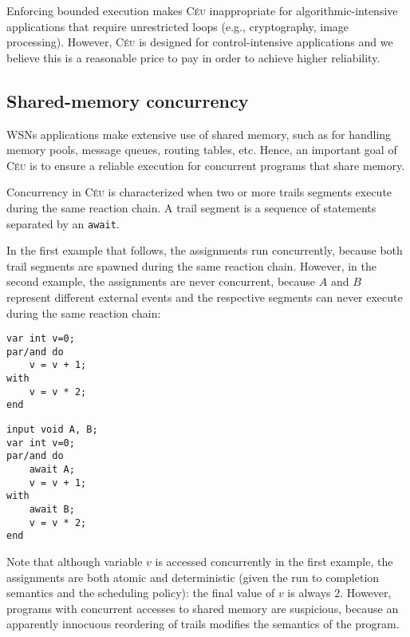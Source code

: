 \documentclass[10pt]{sensys-proc}
\newcommand{\CEU}{\textsc{C\'{e}u}\xspace}
\newcommand{\code}[1] {{\small{\texttt{#1}}}}
\begin{document}
Enforcing bounded execution makes \CEU inappropriate for algorithmic-intensive 
applications that require unrestricted loops (e.g., cryptography, image 
processing).
However, \CEU is designed for control-intensive applications and we believe 
this is a reasonable price to pay in order to achieve higher reliability.


\subsection{Shared-memory concurrency}
\label{sec.ceu.shared}

WSNs applications make extensive use of shared memory, such as for handling 
memory pools, message queues, routing tables, etc.
Hence, an important goal of \CEU is to ensure a reliable execution for 
concurrent programs that share memory.

Concurrency in \CEU is characterized when two or more trails segments execute 
during the same reaction chain.
A trail segment is a sequence of statements separated by an \code{await}.

In the first example that follows, the assignments run concurrently, because 
both trail segments are spawned during the same reaction chain.
However, in the second example, the assignments are never concurrent, because 
$A$ and $B$ represent different external events and the respective segments can 
never execute during the same reaction chain:

\begin{minipage}[t]{0.40\linewidth}
{\small
\begin{verbatim}
var int v=0;
par/and do
    v = v + 1;
with
    v = v * 2;
end
\end{verbatim}
}
\end{minipage}
\hspace{0cm}
\begin{minipage}[t]{0.40\linewidth}
{\small
\begin{verbatim}
input void A, B;
var int v=0;
par/and do
    await A;
    v = v + 1;
with
    await B;
    v = v * 2;
end

\end{verbatim}
}
\end{minipage}

Note that although variable $v$ is accessed concurrently in the first example, 
the assignments are both atomic and deterministic (given the run to completion 
semantics and the scheduling policy): the final value of $v$ is always $2$.
%
However, programs with concurrent accesses to shared memory are suspicious, 
because an apparently innocuous reordering of trails modifies the semantics of 
the program.
\end{document}
